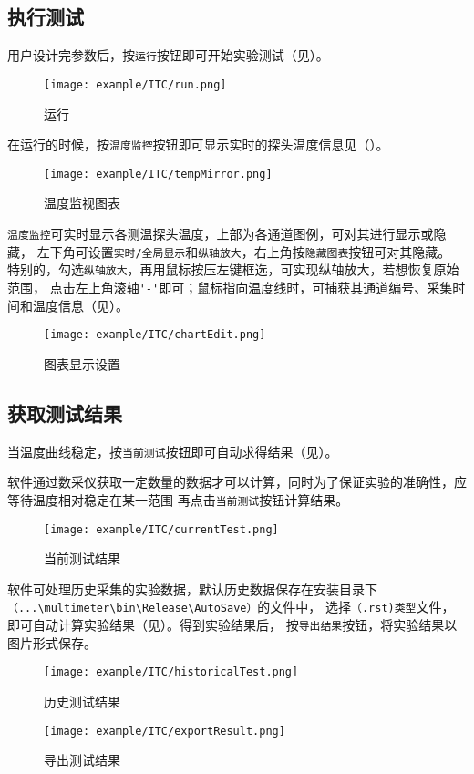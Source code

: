\subsection{执行测试}
用户设计完参数后，按\lstinline{运行}按钮即可开始实验测试（见）。
\begin{figure}[htbp]
	\centering
	\texttt{[image: example/ITC/run.png]}
	\caption{ 运行 \label{fig:exmp_run}}
\end{figure}
在运行的时候，按\lstinline{温度监控}按钮即可显示实时的探头温度信息见（）。
\begin{figure}[htbp]
	\centering
	\texttt{[image: example/ITC/tempMirror.png]}
	\caption{ 温度监视图表 \label{fig:exmp_tempMirror}}
\end{figure}
\lstinline{温度监控}可实时显示各测温探头温度，上部为各通道图例，可对其进行显示或隐藏，
左下角可设置\lstinline{实时/全局显示}和\lstinline{纵轴放大}，右上角按\lstinline{隐藏图表}按钮可对其隐藏。
特别的，勾选\lstinline{纵轴放大}，再用鼠标按压左键框选，可实现纵轴放大，若想恢复原始范围，
点击左上角滚轴\lstinline{'-'}即可；鼠标指向温度线时，可捕获其通道编号、采集时间和温度信息（见）。\\
\begin{figure}[htbp]
	\centering
	\texttt{[image: example/ITC/chartEdit.png]}
	\caption{ 图表显示设置 \label{fig:exmp_chartEdit}}
\end{figure}

\subsection{获取测试结果}
	当温度曲线稳定，按\lstinline{当前测试}按钮即可自动求得结果（见）。
\begin{note}
	软件通过数采仪获取一定数量的数据才可以计算，同时为了保证实验的准确性，应等待温度相对稳定在某一范围
再点击\lstinline{当前测试}按钮计算结果。
\end{note}
\begin{figure}[htbp]
	\centering
	\texttt{[image: example/ITC/currentTest.png]}
	\caption{ 当前测试结果 \label{fig:exmp_currentTest}}
\end{figure}
软件可处理历史采集的实验数据，默认历史数据保存在安装目录下\lstinline{（...\multimeter\bin\Release\AutoSave）}的文件中，
选择\lstinline{（.rst)类型}文件，即可自动计算实验结果（见）。得到实验结果后，
按\lstinline{导出结果}按钮，将实验结果以图片形式保存。
\begin{figure}[htbp]
	\centering
	\texttt{[image: example/ITC/historicalTest.png]}
	\caption{ 历史测试结果 \label{fig:exmp_historicalTest}}
\end{figure}

\begin{figure}[htbp]
	\centering
	\texttt{[image: example/ITC/exportResult.png]}
	\caption{ 导出测试结果 \label{fig:exmp_exportResult}}
\end{figure}